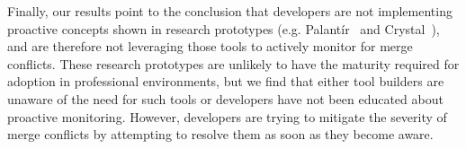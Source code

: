 Finally, our results point to the conclusion that developers are not implementing proactive concepts shown in research prototypes (e.g. Palant\'{i}r~\cite{sarma_palantir:_2003} and Crystal~\cite{Brun2011}), and are therefore not leveraging those tools to actively monitor for merge conflicts.
These research prototypes are unlikely to have the maturity required for adoption in professional environments, but we find that either tool builders are unaware of the need for such tools or developers have not been educated about proactive monitoring.
However, developers are trying to mitigate the severity of merge conflicts by attempting to resolve them as soon as they become aware.\vspace{1.5em}
